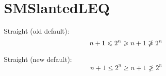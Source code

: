 \documentclass[class=scrartcl,crop=false]{standalone}
\begin{document}
\section{SMSlantedLEQ}

Straight (old default):
\[
    n+1 \leqstraight 2^n \geqstraight n+1 \ngeqstraight 2^n
\]

Straight (new default):
\[
    n+1 \leq 2^n \geq n+1 \ngeq 2^n
\]
\end{document}
